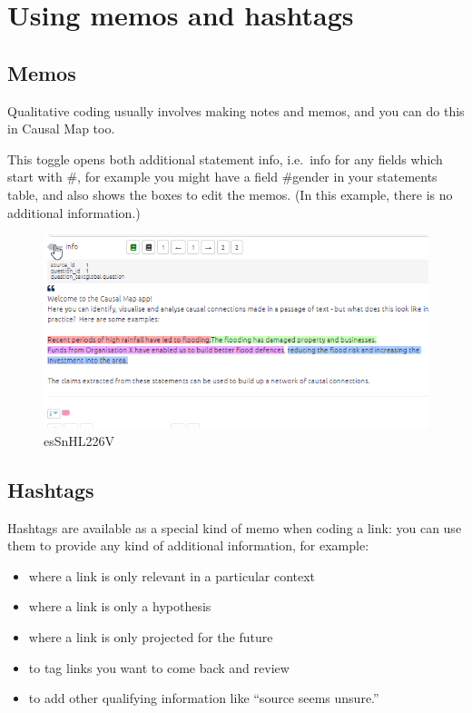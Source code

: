 \documentclass[
]{book}
\providecommand{\tightlist}{%
  \setlength{\itemsep}{0pt}\setlength{\parskip}{0pt}}
\begin{document}
\hypertarget{xmemosandhashtags}{%
\section{Using memos and hashtags}\label{xmemosandhashtags}}

\hypertarget{xlink-memos}{%
\subsection{Memos}\label{xlink-memos}}

Qualitative coding usually involves making notes and memos, and you can do this in Causal Map too.

This toggle opens both additional statement info, i.e.~info for any fields which start with \#, for example you might have a field \#gender in your statements table, and also shows the boxes to edit the memos. (In this example, there is no additional information.)

\begin{figure}
\centering
\includegraphics{_assets/esSnHL226V.gif}
\caption{esSnHL226V}
\end{figure}

\hypertarget{xhashtags}{%
\subsection{Hashtags}\label{xhashtags}}

Hashtags are available as a special kind of memo when coding a link: you can use them to provide any kind of additional information, for example:

\begin{itemize}
\tightlist
\item
  where a link is only relevant in a particular context
\item
  where a link is only a hypothesis
\item
  where a link is only projected for the future
\item
  to tag links you want to come back and review
\item
  to add other qualifying information like ``source seems unsure.''
\end{itemize}
\end{document}
